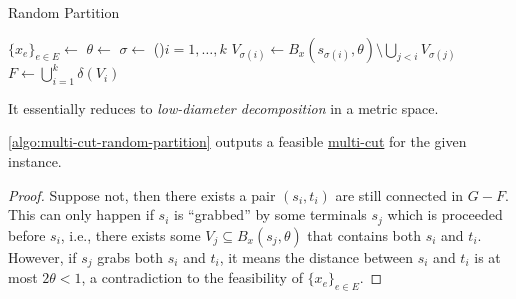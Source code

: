\begin{algorithm}[H]\label{algo:multi-cut-random-partition}
	\DontPrintSemicolon{}
	\caption{Random Partition~\cite{calinescu2005approximation}}

	\BlankLine

	\(\{ x_e \} _{e\in E} \gets\)
	\(\theta \gets\)\uniform{\([0, 1 / 2)\)}\;
	\(\sigma \gets\)
	\For(){\(i = 1, \dots , k\)}{
		\(V_{\sigma (i)} \gets B_x(s_{\sigma (i)}, \theta ) \setminus \bigcup_{j < i} V_{\sigma (j)}\)\label{algo:multi-cut-random-partition-grab}\;
	}
	\(F \gets \bigcup_{i=1}^{k} \delta (V_i)\)\;
	\;
\end{algorithm}

\begin{intuition}
	It essentially reduces to \emph{low-diameter decomposition} in a metric space.
\end{intuition}

\begin{lemma}\label{lma:multi-cut-random-partition-feasible}
	\autoref{algo:multi-cut-random-partition} outputs a feasible \hyperref[prb:multi-min-cut]{multi-cut} for the given instance.
\end{lemma}
\begin{proof}
	Suppose not, then there exists a pair \((s_i, t_i)\) are still connected in \(G - F\). This can only happen if \(s_i\) is ``grabbed'' by some terminals \(s_j\) which is proceeded before \(s_i\), i.e., there exists some \(V_j \subseteq B_x(s_j, \theta )\) that contains both \(s_i\) and \(t_i\). However, if \(s_j\) grabs both \(s_i\) and \(t_i\), it means the distance between \(s_i\) and \(t_i\) is at most \(2 \theta < 1\), a contradiction to the feasibility of \(\{ x_e \} _{e \in E}\).
\end{proof}

